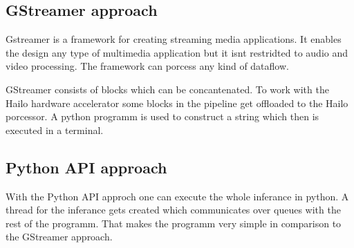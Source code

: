 \subsection{GStreamer approach}

Gstreamer is a framework for creating streaming media applications.
It enables the design any type of multimedia application but it isnt restridted to audio and video processing.
The framework can porcess any kind of dataflow.

GStreamer consists of blocks which can be concantenated.
To work with the Hailo hardware accelerator some blocks in the pipeline get offloaded to the Hailo porcessor.
A python programm is used to construct a string which then is executed in a terminal.


\subsection{Python API approach}

With the Python API approch one can execute the whole inferance in python.
A thread for the inferance gets created which communicates over queues with the rest of the programm.
That makes the programm very simple in comparison to the GStreamer approach.
